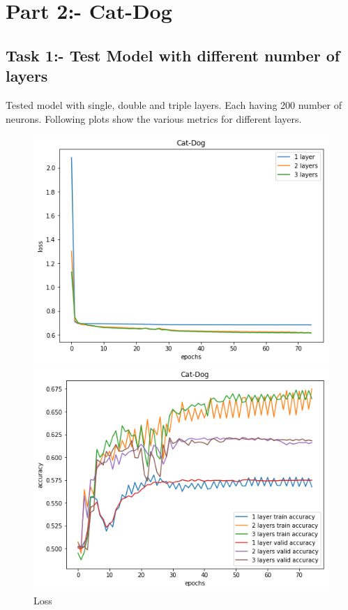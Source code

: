\documentclass{article}
\begin{document}
\pagebreak

\section{Part 2:- Cat-Dog}
\subsection{Task 1:- Test Model with different number of layers}

Tested model with single, double and triple layers. Each having 200 number of neurons. Following plots show the various metrics for different layers.

\begin{figure}[!htb]
	\includegraphics[width=\linewidth]{../output_plots/part_2_task_1_loss.png}
	\caption{Loss}\label{fig:part_2_task_1_loss}
	\endminipage\hfill
	\includegraphics[width=\linewidth]{../output_plots/part_2_task_1_accuracy.png}

\end{figure}
\end{document}
